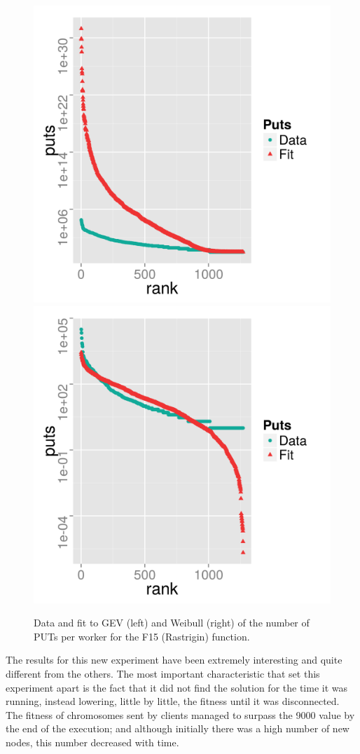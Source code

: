 \documentclass{sig-alternate}
\begin{document}
\begin{figure}[!htb]
\centering
\includegraphics[width=0.49\linewidth]{gev-fit-ww-rastrigin-workers.png}
\includegraphics[width=0.49\linewidth]{weibull-fit-ww-rastrigin-workers.png}
\caption{Data and fit to GEV (left) and Weibull (right) of the number
  of PUTs per worker for the F15 (Rastrigin) function.}  
\label{fig:fit:rastrigin}
\end{figure}
%

The results for this new experiment have been extremely interesting
and quite different from the others. The most important
characteristic that set this experiment apart is
the fact that it did not find the solution for the time it was
running, instead lowering, little by little, the fitness until it was
disconnected. The fitness of chromosomes sent by clients managed to
surpass the 9000 value by the end of the execution; and although initially there
was a high number of new nodes, this number decreased with time.
\end{document}
